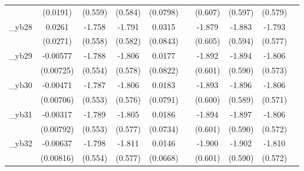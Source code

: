 \begin{table}[htbp]
\begin{tabular}{l*{9}{c}}
            &    (0.0191)         &     (0.559)         &     (0.584)         &    (0.0798)         &                     &     (0.607)         &     (0.597)         &     (0.579)         &                     \\
[1em]
\_yb28       &      0.0261         &      -1.758\sym{***}&      -1.791\sym{***}&      0.0315         &                     &      -1.879\sym{***}&      -1.883\sym{***}&      -1.793\sym{***}&                     \\
            &    (0.0271)         &     (0.558)         &     (0.582)         &    (0.0843)         &                     &     (0.605)         &     (0.594)         &     (0.577)         &                     \\
[1em]
\_yb29       &    -0.00577         &      -1.788\sym{***}&      -1.806\sym{***}&      0.0177         &                     &      -1.892\sym{***}&      -1.894\sym{***}&      -1.806\sym{***}&                     \\
            &   (0.00725)         &     (0.554)         &     (0.578)         &    (0.0822)         &                     &     (0.601)         &     (0.590)         &     (0.573)         &                     \\
[1em]
\_yb30       &    -0.00471         &      -1.787\sym{***}&      -1.806\sym{***}&      0.0183         &                     &      -1.893\sym{***}&      -1.896\sym{***}&      -1.806\sym{***}&                     \\
            &   (0.00706)         &     (0.553)         &     (0.576)         &    (0.0791)         &                     &     (0.600)         &     (0.589)         &     (0.571)         &                     \\
[1em]
\_yb31       &    -0.00317         &      -1.789\sym{***}&      -1.805\sym{***}&      0.0186         &                     &      -1.894\sym{***}&      -1.897\sym{***}&      -1.806\sym{***}&                     \\
            &   (0.00792)         &     (0.553)         &     (0.577)         &    (0.0734)         &                     &     (0.601)         &     (0.590)         &     (0.572)         &                     \\
[1em]
\_yb32       &    -0.00637         &      -1.798\sym{***}&      -1.811\sym{***}&      0.0146         &                     &      -1.900\sym{***}&      -1.902\sym{***}&      -1.810\sym{***}&                     \\
            &   (0.00816)         &     (0.554)         &     (0.577)         &    (0.0668)         &                     &     (0.601)         &     (0.590)         &     (0.572)         &                     \\

\end{tabular}
\end{table}
